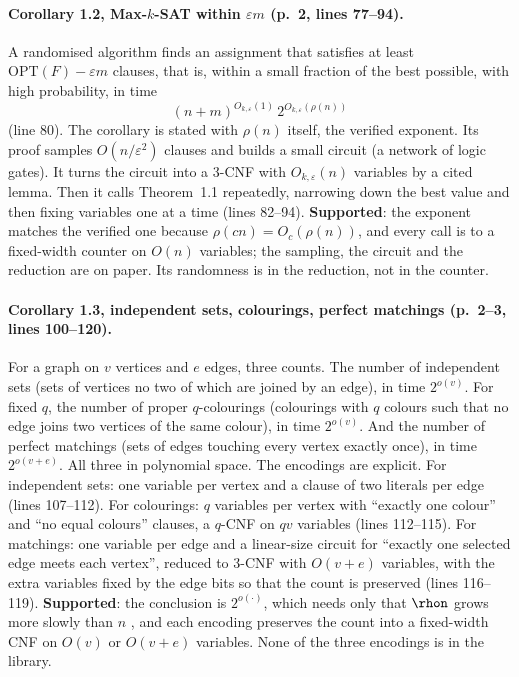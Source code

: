 \paragraph{Corollary 1.2, Max-$k$-SAT within $\varepsilon m$ (p.~2, lines 77--94).}
A randomised algorithm finds an assignment that satisfies at least
$\mathrm{OPT}(F) - \varepsilon m$ clauses, that is, within a small
fraction of the best possible, with high probability, in time
\[
  (n+m)^{O_{k,\varepsilon}(1)}\,2^{O_{k,\varepsilon}(\rho(n))}
\]
(line 80). The corollary is stated with $\rho(n)$ itself, the verified
exponent. Its proof samples $O(n/\varepsilon^2)$ clauses and builds a small circuit (a network of logic gates). It turns the circuit into a 3-CNF with
$O_{k,\varepsilon}(n)$ variables by a cited lemma. Then it calls Theorem~1.1 repeatedly, narrowing down the best value and then fixing variables one at a time (lines 82--94).
\textbf{Supported}: the exponent matches the verified one because
$\rho(cn) = O_c(\rho(n))$, and every call is to a fixed-width counter on
$O(n)$ variables; the sampling, the circuit and the reduction are on
paper. Its randomness is in the reduction, not in the counter.

\paragraph{Corollary 1.3, independent sets, colourings, perfect matchings (p.~2--3, lines 100--120).}
For a graph on $v$ vertices and $e$ edges, three counts. The number of
independent sets (sets of vertices no two of which are joined by an
edge), in time $2^{o(v)}$. For fixed $q$, the number of proper
$q$-colourings (colourings with $q$ colours such that no edge joins two
vertices of the same colour), in time $2^{o(v)}$. And the number of
perfect matchings (sets of edges touching every vertex exactly once), in
time $2^{o(v+e)}$. All three in polynomial space. The encodings are
explicit. For independent sets: one variable per vertex and a clause of
two literals per edge (lines 107--112). For colourings: $q$ variables per
vertex with ``exactly one colour'' and ``no equal colours'' clauses, a
$q$-CNF on $qv$ variables (lines 112--115). For matchings: one variable
per edge and a linear-size circuit for ``exactly one selected edge meets
each vertex'', reduced to 3-CNF with $O(v+e)$ variables, with the extra
variables fixed by the edge bits so that the count is preserved (lines
116--119). \textbf{Supported}: the conclusion is
$2^{o(\cdot)}$, which needs only that $\rhon$ grows more slowly than $n$
, and each encoding preserves the count into a
fixed-width CNF on $O(v)$ or $O(v+e)$ variables. None of the three
encodings is in the library.

